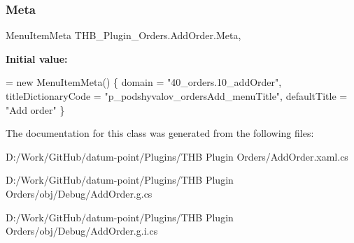 \subsubsection{\texorpdfstring{Meta}{Meta}}
{\footnotesize\ttfamily Menu\+Item\+Meta T\+H\+B\+\_\+\+Plugin\+\_\+\+Orders.\+Add\+Order.\+Meta\hspace{0.3cm}{\ttfamily [get]}, {\ttfamily [set]}}

{\bfseries Initial value\+:}
\begin{DoxyCode}
= \textcolor{keyword}{new} MenuItemMeta()
        \{
            domain = \textcolor{stringliteral}{"40\_orders.10\_addOrder"},
            titleDictionaryCode = \textcolor{stringliteral}{"p\_podshyvalov\_ordersAdd\_menuTitle"},
            defaultTitle = \textcolor{stringliteral}{"Add order"}
        \}
\end{DoxyCode}


The documentation for this class was generated from the following files\+:\begin{DoxyCompactItemize}
\item 
D\+:/\+Work/\+Git\+Hub/datum-\/point/\+Plugins/\+T\+H\+B Plugin Orders/Add\+Order.\+xaml.\+cs\item 
D\+:/\+Work/\+Git\+Hub/datum-\/point/\+Plugins/\+T\+H\+B Plugin Orders/obj/\+Debug/Add\+Order.\+g.\+cs\item 
D\+:/\+Work/\+Git\+Hub/datum-\/point/\+Plugins/\+T\+H\+B Plugin Orders/obj/\+Debug/Add\+Order.\+g.\+i.\+cs\end{DoxyCompactItemize}
